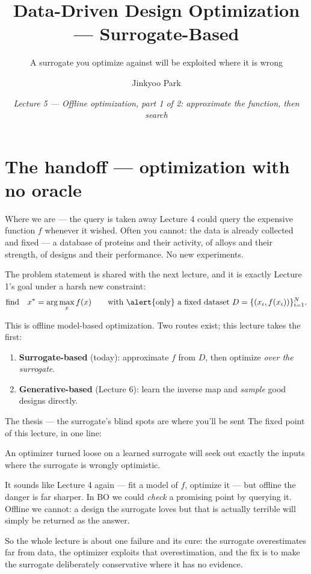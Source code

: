 \documentclass[10pt, aspectratio=169]{beamer}
\title{Data-Driven Design Optimization --- Surrogate-Based}
\subtitle{A surrogate you optimize against will be exploited where it is wrong}
\author{Jinkyoo Park}
\institute{KAIST}
\date{\textit{Lecture 5 --- Offline optimization, part 1 of 2: approximate the function, then search}}
\begin{document}
\maketitle

\section{The handoff --- optimization with no oracle}

\begin{frame}{Where we are --- the query is taken away}
\vspace{2pt}
Lecture 4 could \alert{query} the expensive function $f$ whenever it wished. Often you cannot: the data is already collected and \alert{fixed} --- a database of proteins and their activity, of alloys and their strength, of designs and their performance. No new experiments.
\medskip

\pause
The problem statement is shared with the next lecture, and it is exactly Lecture 1's goal under a harsh new constraint:
\[
\text{find}\quad x^* = \arg\max_x f(x) \qquad \text{with \alert{only} a fixed dataset } D = \{(x_i, f(x_i))\}_{i=1}^N.
\]
\medskip

\pause
This is \alert{offline model-based optimization}. Two routes exist; this lecture takes the first:
\begin{enumerate}\setlength\itemsep{1pt}
\item \textbf{Surrogate-based} (today): approximate $f$ from $D$, then optimize \emph{over the surrogate}.
\item \textbf{Generative-based} (Lecture 6): learn the inverse map and \emph{sample} good designs directly.
\end{enumerate}
\end{frame}

\begin{frame}{The thesis --- the surrogate's blind spots are where you'll be sent}
The fixed point of this lecture, in one line:
\begin{center}\large
\alert{An optimizer turned loose on a learned surrogate will seek out exactly the inputs where the surrogate is wrongly optimistic.}
\end{center}
\medskip

\pause
It sounds like Lecture 4 again --- fit a model of $f$, optimize it --- but offline the danger is far sharper. In BO we could \emph{check} a promising point by querying it. Offline we cannot: a design the surrogate loves but that is actually terrible will simply be \alert{returned as the answer}.
\medskip

\pause
So the whole lecture is about one failure and its cure: the surrogate \alert{overestimates} far from data, the optimizer \alert{exploits} that overestimation, and the fix is to make the surrogate deliberately \alert{conservative} where it has no evidence.
\end{frame}
\end{document}
